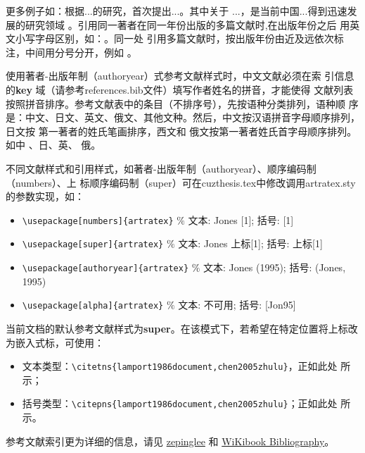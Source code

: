 更多例子如：\citet{walls2013drought}根据...的研究，首次提出...。其中关于
...\citep{walls2013drought}，是当前中国...得到迅速发展的研究领域
\citep{chen1980zhongguo}。引用同一著者在同一年份出版的多篇文献时,在出版年份之后
用英文小写字母区别，如：\citep{yuan2012lana, yuan2012lanb, yuan2012lanc}。同一处
引用多篇文献时，按出版年份由近及远依次标注，中间用分号分开，例如
\citep{chen1980zhongguo, stamerjohanns2009mathml, hls2012jinji, niu2013zonghe}。

使用著者-出版年制（authoryear）式参考文献样式时，中文文献必须在索
引信息的\textbf{key} 域（请参考references.bib文件）填写作者姓名的拼音，才能使得
文献列表按照拼音排序。参考文献表中的条目（不排序号），先按语种分类排列，语种顺
序是：中文、日文、英文、俄文、其他文种。然后，中文按汉语拼音字母顺序排列，日文按
第一著者的姓氏笔画排序，西文和 俄文按第一著者姓氏首字母顺序排列。如中
\citep{niu2013zonghe}、日\citep{Bohan1928}、英\citep{stamerjohanns2009mathml}、
俄\citep{Dubrovin1906}。

不同文献样式和引用样式，如著者-出版年制（authoryear）、顺序编码制（numbers）、上
标顺序编码制（super）可在cuzthesis.tex中修改调用artratex.sty的参数实现，如：
\begin{itemize}
    \item \verb+\usepackage[numbers]{artratex}+ $\%$ 文本: Jones [1]; 括号: [1]
    \item \verb+\usepackage[super]{artratex}+ $\%$ 文本: Jones 上标[1]; 括号: 上标[1]
    \item \verb+\usepackage[authoryear]{artratex}+ $\%$ 文本: Jones (1995); 括号: (Jones, 1995)
    \item \verb+\usepackage[alpha]{artratex}+ $\%$ 文本: 不可用; 括号: [Jon95]
\end{itemize}

当前文档的默认参考文献样式为\textbf{super}。在该模式下，若希望在特定位置将上标改
为嵌入式标，可使用：

\begin{itemize}
    \item 文本类型：\verb|\citetns{lamport1986document,chen2005zhulu}|，正如此处
    所示；
    \item 括号类型：\verb|\citepns{lamport1986document,chen2005zhulu}|；正如此处
    所示。
\end{itemize}

参考文献索引更为详细的信息，请见
\href{https://github.com/zepinglee/gbt7714-bibtex-style}{zepinglee} 和
\href{https://en.wikibooks.org/wiki/LaTeX/Bibliography_Management}{WiKibook
Bibliography}。

